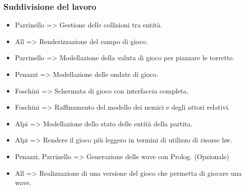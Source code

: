 \subsubsection*{Suddivisione del lavoro}
\begin{itemize}
    \item Parrinello => Gestione delle collisioni tra entità.
    \item All => Renderizzazione del campo di gioco.
    \item Parrinello => Modellazione della valuta di gioco per piazzare le torrette.
    \item Penazzi => Modellazione delle ondate di gioco.
    \item Foschini => Schermata di gioco con interfaccia completa.
    \item Foschini => Raffinamento del modello dei nemici e degli attori relativi.
    \item Alpi => Modellazione dello stato delle entità della partita.
    \item Alpi => Rendere il gioco più leggero in termini di utilizzo di risorse hw.
    \item Penazzi, Parrinello => Generazione delle wave con Prolog. (Opzionale)
    \item All => Realizzazione di una versione del gioco che permetta di giocare una wave.
\end{itemize}

